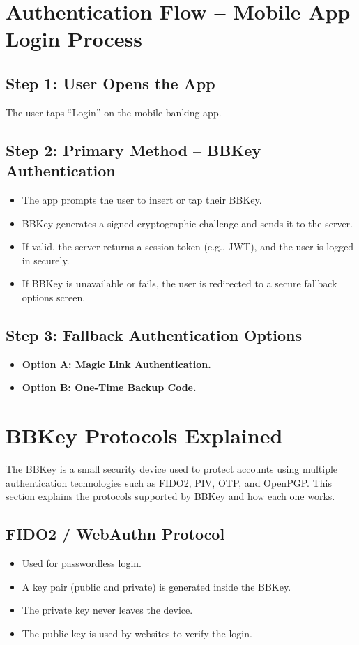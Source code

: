 \documentclass[12pt]{article}
\begin{document}
\section*{Authentication Flow – Mobile App Login Process}

\subsection*{Step 1: User Opens the App}
The user taps “Login” on the mobile banking app.

\subsection*{Step 2: Primary Method – BBKey Authentication}
\begin{itemize}
    \item The app prompts the user to insert or tap their BBKey.
    \item BBKey generates a signed cryptographic challenge and sends it to the server.
    \item If valid, the server returns a session token (e.g., JWT), and the user is logged in securely.
    \item If BBKey is unavailable or fails, the user is redirected to a secure fallback options screen.
\end{itemize}

\subsection*{Step 3: Fallback Authentication Options}
\begin{itemize}
    \item \textbf{Option A: Magic Link Authentication.}
    \item \textbf{Option B: One-Time Backup Code.}
\end{itemize}

\section*{BBKey Protocols Explained}
The BBKey is a small security device used to protect accounts using multiple authentication technologies such as FIDO2, PIV, OTP, and OpenPGP. This section explains the protocols supported by BBKey and how each one works.

\subsection*{FIDO2 / WebAuthn Protocol}
\begin{itemize}
    \item Used for passwordless login.
    \item A key pair (public and private) is generated inside the BBKey.
    \item The private key never leaves the device.
    \item The public key is used by websites to verify the login.
\end{itemize}
\end{document}
